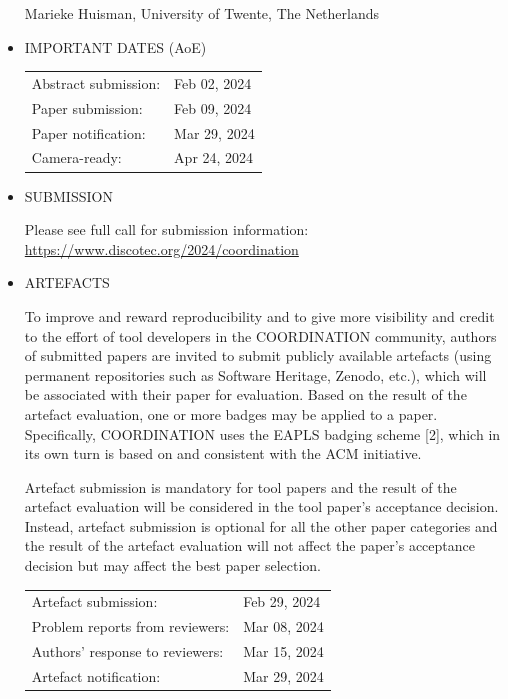 \documentclass[prodmode,acmtecs]{acmsmall} %
\begin{document}
\begin{itemize}
  Marieke Huisman, University of Twente, The Netherlands 
 
\item  IMPORTANT DATES (AoE)  
 
\begin{tabulary}{\linewidth}{LL}Abstract submission:  & Feb 02, 2024 \\
Paper submission:  & Feb 09, 2024 \\
Paper notification:  & Mar 29, 2024 \\
Camera-ready:  & Apr 24, 2024 \\
\end{tabulary}
 
\item  SUBMISSION 
 
  Please see full call for submission information: \href{https://www.discotec.org/2024/coordination}{https://www.discotec.org/2024/coordination} 
 
\item  ARTEFACTS 
 
  To improve and reward reproducibility and to give more visibility and credit to the effort of tool developers in the COORDINATION community, authors of submitted papers are invited to submit publicly available artefacts (using permanent repositories such as Software Heritage, Zenodo, etc.), which will be associated with their paper for evaluation. Based on the result of the artefact evaluation, one or more badges may be applied to a paper. Specifically, COORDINATION uses the EAPLS badging scheme [2], which in its own turn is based on and consistent with the ACM initiative. 
 
  Artefact submission is mandatory for tool papers and the result of the artefact evaluation will be considered in the tool paper's acceptance decision. Instead, artefact submission is optional for all the other paper categories and the result of the artefact evaluation will not affect the paper's acceptance decision but may affect the best paper selection. 
 
\begin{tabulary}{\linewidth}{LL}Artefact submission:  & Feb 29, 2024 \\
Problem reports from reviewers:  & Mar 08, 2024 \\
Authors' response to reviewers:  & Mar 15, 2024 \\
Artefact notification:  & Mar 29, 2024 \\
\end{tabulary}
 

\end{itemize}
\end{document}
